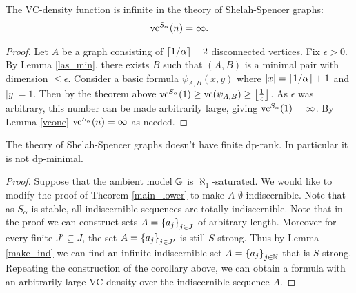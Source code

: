 \begin{Corollary}
  The VC-density function is infinite in the theory of Shelah-Spencer graphs:
  \begin{align*}
    \operatorname{vc}^{S_\alpha}(n) = \infty.
  \end{align*}
\end{Corollary}

\begin{proof}
  Let $A$ be a graph consisting of $\left \lceil 1/\alpha \right \rceil + 2$ disconnected vertices.
  Fix $\epsilon > 0$.
  By Lemma \ref{las_min}, there exists $B$ such that $(A, B)$ is a minimal pair with dimension $\leq \epsilon$.
  Consider a basic formula $\psi_{A, B}(x, y)$ where $|x| = \left \lceil 1/\alpha \right \rceil + 1$ and $|y| = 1$.
  Then by the theorem above $\operatorname{vc}^{S_\alpha}(1) \geq \operatorname{vc} (\psi_{A,B}) \geq \left \lfloor \frac{1}{\epsilon} \right \rfloor$.
  As $\epsilon$ was arbitrary, this number can be made arbitrarily large, giving $\operatorname{vc}^{S_\alpha}(1) = \infty$.
  By Lemma \ref{vcone} $\operatorname{vc}^{S_\alpha}(n) = \infty$ as needed.
\end{proof}

\begin{Corollary}
  The theory of Shelah-Spencer graphs doesn't have finite dp-rank.
  In particular it is not dp-minimal.
\end{Corollary}

\begin{proof}
  Suppose that the ambient model $\mathbb G$ is $\aleph_1$-saturated.
  We would like to modify the proof of Theorem \ref{main_lower} to make $A$ $\emptyset$-indiscernible.
  Note that as $S_\alpha$ is stable, all indiscernible sequences are totally indiscernible.
  Note that in the proof we can construct sets $A = \left\{a_j\right\}_{j \in J}$ of arbitrary length.
  Moreover for every finite $J' \subseteq J$, the set $A = \left\{a_j\right\}_{j \in J'}$ is still $S$-strong.
  Thus by Lemma \ref{make_ind} we can find an infinite indiscernible set $A = \left\{a_j\right\}_{j \in \mathbb{N}}$ that is $S$-strong.
  Repeating the construction of the corollary above,
  we can obtain a formula with an arbitrarily large VC-density over the indiscernible sequence $A$.
\end{proof}



